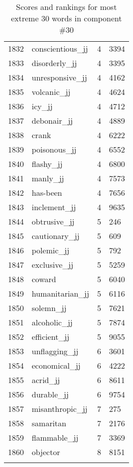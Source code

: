 \begin{longtable}[!htbp]{| rlr@{.}l |}
    1832 & conscientious\_jj & 4 & 3394 \\
    1833 & disorderly\_jj & 4 & 3395 \\
    1834 & unresponsive\_jj & 4 & 4162 \\
    1835 & volcanic\_jj & 4 & 4624 \\
    1836 & icy\_jj & 4 & 4712 \\
    1837 & debonair\_jj & 4 & 4889 \\
    1838 & crank & 4 & 6222 \\
    1839 & poisonous\_jj & 4 & 6552 \\
    1840 & flashy\_jj & 4 & 6800 \\
    1841 & manly\_jj & 4 & 7573 \\
    1842 & has-been & 4 & 7656 \\
    1843 & inclement\_jj & 4 & 9635 \\
    1844 & obtrusive\_jj & 5 & 246 \\
    1845 & cautionary\_jj & 5 & 609 \\
    1846 & polemic\_jj & 5 & 792 \\
    1847 & exclusive\_jj & 5 & 5259 \\
    1848 & coward & 5 & 6040 \\
    1849 & humanitarian\_jj & 5 & 6116 \\
    1850 & solemn\_jj & 5 & 7621 \\
    1851 & alcoholic\_jj & 5 & 7874 \\
    1852 & efficient\_jj & 5 & 9055 \\
    1853 & unflagging\_jj & 6 & 3601 \\
    1854 & economical\_jj & 6 & 4222 \\
    1855 & acrid\_jj & 6 & 8611 \\
    1856 & durable\_jj & 6 & 9754 \\
    1857 & misanthropic\_jj & 7 & 275 \\
    1858 & samaritan & 7 & 2176 \\
    1859 & flammable\_jj & 7 & 3369 \\
    1860 & objector & 8 & 8151 \\
    \hline
    \caption{Scores and rankings for most extreme 30 words in component \#30} \\
\end{longtable}
